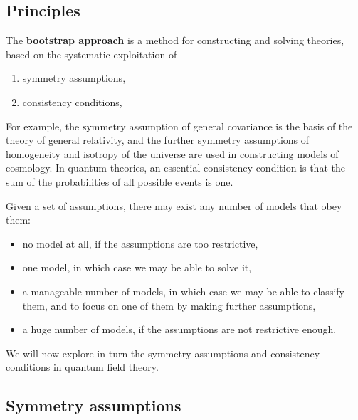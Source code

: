 \documentclass[12pt, a4paper, notitlepage, twoside]{report}
\numberwithin{equation}{section}
\theoremstyle{break}
\begin{document}
\subsection{Principles \label{secprin}}

The \textbf{\boldmath bootstrap approach} is a method for constructing and solving theories, based on the systematic exploitation of 
\begin{enumerate}
 \item symmetry assumptions,
 \item consistency conditions,
\end{enumerate}
For example, the symmetry assumption of general covariance is the basis of the theory of general relativity, and the further symmetry assumptions of homogeneity and isotropy of the universe are used in constructing models of cosmology.
In quantum theories, an essential consistency condition is that the sum of the probabilities of all possible events is one. 

Given a set of assumptions, there may exist any number of models that obey them:
\begin{itemize}
 \item no model at all, if the assumptions are too restrictive,
\item one model, in which case we may be able to solve it,
\item a manageable number of models, in which case we may be able to classify them, and to focus on one of them by making further assumptions,
\item a huge number of models, if the assumptions are not restrictive enough.
\end{itemize}
We will now explore in turn the symmetry assumptions and consistency conditions in quantum field theory. 

\subsection{Symmetry assumptions \label{secsa}}
\end{document}
